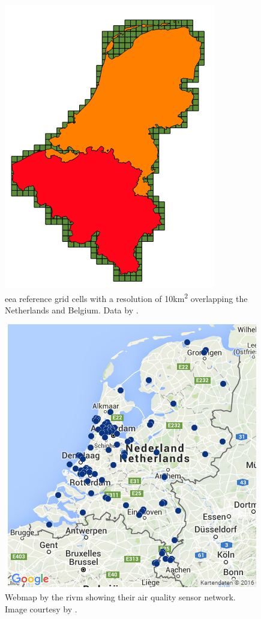 \begin{figure}[!h]
	\centering
	\includegraphics[width=0.7\linewidth]{figs/EEA10km.png}
	\caption{\ac{eea} reference grid cells with a resolution of 10km\textsuperscript{2} overlapping the Netherlands and Belgium. Data by \cite{DATA:EEA}.}
	\label{fig:10KM}
\end{figure}

\begin{figure}[!h]
	\centering
	\includegraphics[width=0.6\linewidth]{figs/RIVMSensors.png}
	\caption{Webmap by the \acf{rivm} showing their air quality sensor network. Image courtesy by \cite{DATA:RIVM}.}
	\label{fig:RIVMSensor}
\end{figure}

